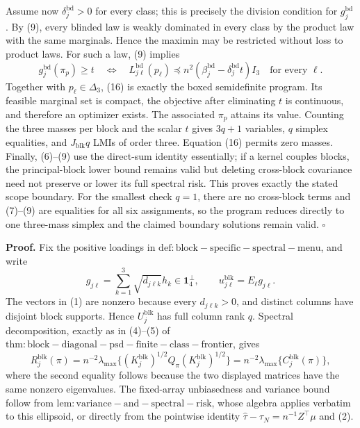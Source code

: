 Assume now \(\delta_j^{\mathrm{bd}}>0\) for every class; this is precisely the division condition for \(g_j^{\mathrm{bd}}\).  By (9), every blinded law is weakly dominated in every class by the product law with the same marginals.  Hence the maximin may be restricted without loss to product laws.  For such a law, (9) implies
\[
g_j^{\mathrm{bd}}(\pi_p)\ge t
\quad\Longleftrightarrow\quad
L_{j\ell}^{\mathrm{bd}}(p_\ell)
\preceq n^2(\beta_j^{\mathrm{bd}}-\delta_j^{\mathrm{bd}}t)I_3
\quad\text{for every }\ell. \tag{16}
\]
Together with \(p_\ell\in\Delta_3\), (16) is exactly the boxed semidefinite program.  Its feasible marginal set is compact, the objective after eliminating \(t\) is continuous, and therefore an optimizer exists.  The associated \(\pi_p\) attains its value.  Counting the three masses per block and the scalar \(t\) gives \(3q+1\) variables, \(q\) simplex equalities, and \(J_{\mathrm{blk}}q\) LMIs of order three.  Equation (16) permits zero masses.  Finally, (6)--(9) use the direct-sum identity essentially; if a kernel couples blocks, the principal-block lower bound remains valid but deleting cross-block covariance need not preserve or lower its full spectral risk.  This proves exactly the stated scope boundary.  For the smallest check \(q=1\), there are no cross-block terms and (7)--(9) are equalities for all six assignments, so the program reduces directly to one three-mass simplex and the claimed boundary solutions remain valid. \(\square\)

\textbf{Proof.}
Fix the positive loadings in \(\mathrm{def:block-specific-spectral-menu}\), and write
\[
g_{j\ell}=\sum_{k=1}^3\sqrt{d_{j\ell k}}h_k\in\mathbf1_4^\perp,
\qquad u_{j\ell}^{\mathrm{blk}}=E_\ell g_{j\ell}. \tag{1}
\]
The vectors in (1) are nonzero because every \(d_{j\ell k}>0\), and distinct columns have disjoint block supports.  Hence \(U_j^{\mathrm{blk}}\) has full column rank \(q\).  Spectral decomposition, exactly as in (4)--(5) of \(\mathrm{thm:block-diagonal-psd-finite-class-frontier}\), gives
\[
R_j^{\mathrm{blk}}(\pi)
=n^{-2}\lambda_{\max}\{(K_j^{\mathrm{blk}})^{1/2}Q_\pi(K_j^{\mathrm{blk}})^{1/2}\}
=n^{-2}\lambda_{\max}\{C_j^{\mathrm{blk}}(\pi)\}, \tag{2}
\]
where the second equality follows because the two displayed matrices have the same nonzero eigenvalues.  The fixed-array unbiasedness and variance bound follow from \(\mathrm{lem:variance-and-spectral-risk}\), whose algebra applies verbatim to this ellipsoid, or directly from the pointwise identity \(\widehat\tau-\tau_N=n^{-1}Z^\top\mu\) and (2).

